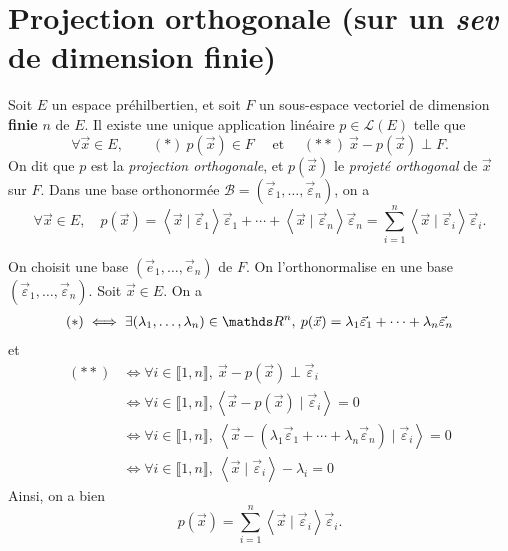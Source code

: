 \section{Projection orthogonale (sur un \textit{sev} de dimension finie)}

\begin{prop-defn}
	Soit $E$\/ un espace préhilbertien\footnotemark, et soit $F$\/ un sous-espace vectoriel de dimension \textbf{finie} $n$\/ de $E$.
	Il existe une unique application linéaire $p \in \mathcal{L}(E)$\/ telle que \[
		\forall \vec{x} \in E,\qquad (*)\ p(\vec{x}) \in F\quad \text{ et }\quad (**)\ \vec{x} - p(\vec{x}) \perp F
	.\]
	On dit que $p$\/ est la \textit{projection orthogonale}, et $p(\vec{x})$\/ le \textit{projeté orthogonal} de $\vec{x}$\/ sur $F$. Dans une base orthonormée $\mathcal{B} = (\vec{\varepsilon}_1,\ldots,\vec{\varepsilon}_n)$, on a \[
		\forall \vec{x} \in E,\quad p(\vec{x}) = \left<\vec{x} \mid \vec{\varepsilon}_1 \right> \vec{\varepsilon}_1 + \cdots + \left<\vec{x}  \mid \vec{\varepsilon}_n \right> \vec{\varepsilon}_n = \sum_{i=1}^n \left<\vec{x}  \mid \vec{\varepsilon}_i \right> \vec{\varepsilon}_i
	.\] 
\end{prop-defn}

\begin{prv}
	On choisit une base $(\vec{e}_1, \ldots, \vec{e}_n)$\/ de $F$. On l'orthonormalise en une base $(\vec{\varepsilon}_1,\ldots,\vec{\varepsilon}_n)$. Soit $\vec{x} \in E$. On a 
	\begin{align*}
		(*) &\iff \exists (\lambda_1,\ldots,\lambda_n) \in \R^n,\:p(\vec{x}) = \lambda_1 \vec{\varepsilon}_1 +\cdots + \lambda_n \vec{\varepsilon}_n\\
	\end{align*}
	et
	\begin{align*}
		(**) &\iff \forall i \in \llbracket 1,n \rrbracket,\: \vec{x} - p(\vec{x}) \perp \vec{\varepsilon}_i\\
		&\iff \forall i \in \llbracket 1,n \rrbracket, \left<\vec{x} - p(\vec{x})  \mid \vec{\varepsilon}_i \right> = 0\\
		&\iff \forall i \in \llbracket 1,n \rrbracket,\: \left<\vec{x} - (\lambda_1\vec{\varepsilon}_1 + \cdots + \lambda_n \vec{\varepsilon}_n)  \mid \vec{\varepsilon}_i \right> = 0\\
		&\iff \forall i \in \llbracket 1,n \rrbracket,\: \left<\vec{x} \mid \vec{\varepsilon}_i \right> - \lambda_i = 0
	\end{align*}
	Ainsi, on a bien \[
		p(\vec{x}) = \sum_{i=1}^n \left<\vec{x} \mid \vec{\varepsilon}_i \right> \vec{\varepsilon}_i
	.\]
\end{prv}

